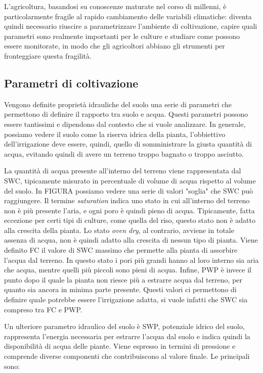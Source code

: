 \documentclass[12pt,a4paper,openright,twoside]{book}
\begin{document}
L'agricoltura, basandosi su conoscenze maturate nel corso di millenni, è particolarmente fragile al rapido cambiamento delle variabili climatiche\cite{Janani2024}: diventa quindi necessario riuscire a parametrizzare l'ambiente di coltivazione, capire quali parametri sono realmente importanti per le culture e studiare come possono essere monitorate, in modo che gli agricoltori abbiano gli strumenti per fronteggiare questa fragilità\cite{Monteleone2023}.

\subsection{Parametri di coltivazione}

Vengono definite proprietà idrauliche del suolo una serie di parametri che permettono di definire il rapporto tra suolo e acqua. Questi parametri possono essere tantissimi e dipendono dal contesto che si vuole analizzare.
In generale, possiamo vedere il suolo come la riserva idrica della pianta, l'obbiettivo dell'irrigazione deve essere, quindi, quello di somministrare la giusta quantità di acqua, evitando quindi di avere un terreno troppo bagnato o troppo asciutto.

La quantità di acqua presente all'interno del terreno viene rappresentata dal \ac{SWC}, tipicamente misurato in percentuale di volume di acqua rispetto al volume del suolo.
In FIGURA possiamo vedere una serie di valori "soglia" che \ac{SWC} può raggiungere.
Il termine \textit{saturation} indica uno stato in cui all'interno del terreno non è più presente l'aria, e ogni poro è quindi pieno di acqua. Tipicamente, fatta eccezione per certi tipi di culture, come quella del riso, questo stato non è adatto alla crescita della pianta.
Lo stato \textit{oven dry}, al contrario, avviene in totale assenza di acqua, non è quindi adatto alla crescita di nessun tipo di pianta.
Viene definito \ac{FC} il valore di \ac{SWC} massimo che permette alla pianta di assorbire l'acqua dal terreno. In questo stato i pori più grandi hanno al loro interno sia aria che acqua, mentre quelli più piccoli sono pieni di acqua.
Infine, \ac{PWP} è invece il punto dopo il quale la pianta non riesce più a estrarre acqua dal terreno, per quanto sia ancora in minima parte presente\cite{RAI2017505}.
Questi valori ci permettono di definire quale potrebbe essere l'irrigazione adatta, si vuole infatti che \ac{SWC} sia compreso tra \ac{FC} e \ac{PWP}.

Un ulteriore parametro idraulico del suolo è \ac{SWP}, potenziale idrico del suolo, rappresenta l'energia necessaria per estrarre l'acqua dal suolo e indica quindi la disponibilità di acqua delle piante. Viene espresso in termini di pressione e comprende diverse componenti che contribuiscono al valore finale\cite{MarshallT.J.TheoJohn1996Sp}. Le principali sono:
\end{document}
